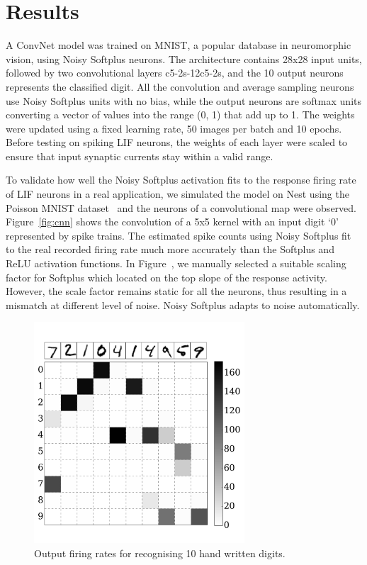 \section{Results}
	A ConvNet model was trained on MNIST,
	a popular database in neuromorphic vision, using Noisy Softplus neurons.
	The architecture contains 28x28 input units, followed by two convolutional layers c5-2s-12c5-2s, and the 10 output neurons represents the classified digit.
	All the convolution and average sampling neurons use Noisy Softplus units with no bias, while the output neurons are softmax units converting a vector of values into the range (0, 1) that add up to 1.
	The weights were updated using a fixed learning rate, 50 images per batch and 10 epochs.
	Before testing on spiking LIF neurons, the weights of each layer were scaled to ensure that input synaptic currents stay within a valid range.
	
	To validate how well the Noisy Softplus activation fits to the response firing rate of LIF neurons in a real application, we simulated the model on Nest using the Poisson MNIST dataset~\cite{liu2016bench} and the neurons of a convolutional map were observed.
	Figure~\ref{fig:cnn} shows the convolution of a 5x5 kernel with an input digit `0' represented by spike trains.
	The estimated spike counts using Noisy Softplus fit to the real recorded firing rate much more accurately than the Softplus and ReLU activation functions.
	In Figure~, we manually selected a suitable scaling factor for Softplus which located on the top slope of the response activity.
	However, the scale factor remains static for all the neurons, thus resulting in a mismatch at different level of noise.
	Noisy Softplus adapts to noise automatically.
		\begin{figure}
			\centering
			\includegraphics[width=0.7\textwidth]{pics_iconip/7.pdf}
			\caption{Output firing rates for recognising 10 hand written digits.}
			\label{Fig:out}
		\end{figure}
	
